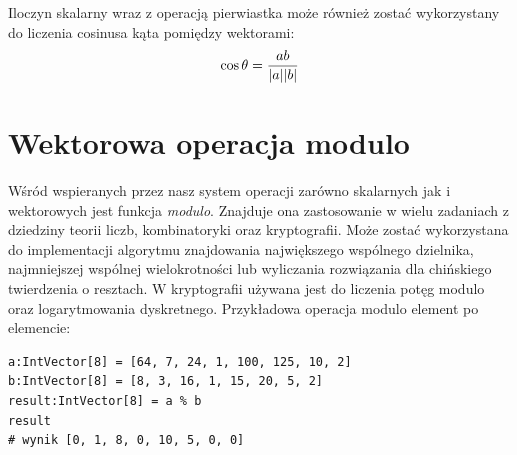 Iloczyn skalarny wraz z operacją pierwiastka może również zostać wykorzystany do liczenia cosinusa kąta pomiędzy wektorami:
$$ \cos{\theta} = \frac{ab}{\lvert a\rvert \lvert b\rvert} $$
\section{Wektorowa operacja modulo}
Wśród wspieranych przez nasz system operacji zarówno skalarnych jak i wektorowych jest funkcja \textit{modulo}. Znajduje ona zastosowanie w wielu zadaniach z dziedziny teorii liczb, kombinatoryki oraz kryptografii. Może zostać wykorzystana do implementacji algorytmu znajdowania największego wspólnego dzielnika, najmniejszej wspólnej wielokrotności lub wyliczania rozwiązania dla chińskiego twierdzenia o resztach. W kryptografii używana jest do liczenia potęg modulo oraz logarytmowania dyskretnego.
Przykładowa operacja modulo element po elemencie: 
\begin{lstlisting}[frame=single]
a:IntVector[8] = [64, 7, 24, 1, 100, 125, 10, 2]
b:IntVector[8] = [8, 3, 16, 1, 15, 20, 5, 2]
result:IntVector[8] = a % b
result
# wynik [0, 1, 8, 0, 10, 5, 0, 0]
\end{lstlisting}
